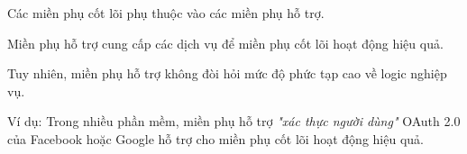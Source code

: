 Các miền phụ cốt lõi phụ thuộc vào các miền phụ hỗ trợ.

Miền phụ hỗ trợ cung cấp các dịch vụ để miền phụ cốt lõi hoạt động hiệu quả.

Tuy nhiên, miền phụ hỗ trợ không đòi hỏi mức độ phức tạp cao về logic nghiệp vụ.

Ví dụ: Trong nhiều phần mềm, miền phụ hỗ trợ \textit{"xác thực người dùng"} OAuth 2.0 của Facebook hoặc Google hỗ trợ cho miền phụ cốt lõi hoạt động hiệu quả.